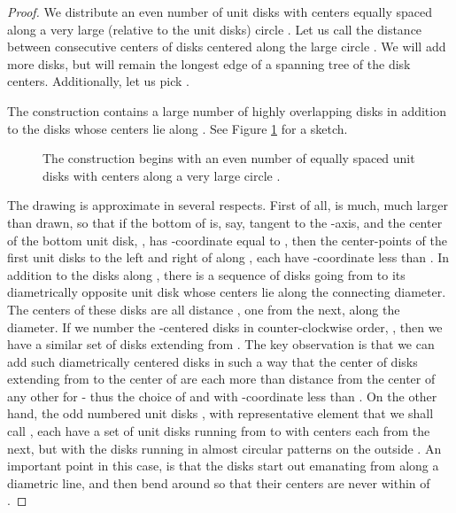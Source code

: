 \begin{proof}
We distribute an even number of unit disks with centers equally spaced along a very large (relative to the unit disks) circle .  Let us call the distance between consecutive centers of disks centered along the large circle  .  We will add more disks, but  will remain the longest edge of a spanning tree of the disk centers.  Additionally, let us pick .

The construction contains a large number of highly overlapping disks in addition to the disks whose centers lie along .  See Figure \ref{flower} for a sketch.
\begin{figure}[h]
\centerline{}
\caption{The construction begins with an even number of equally spaced unit disks with centers along a very large circle .}
\label{flower}
\end{figure}
The drawing is approximate in several respects.  First of all,  is much, much larger than drawn, so that if the bottom of  is, say, tangent to the -axis, and the center of the bottom unit disk, , has -coordinate equal to , then the center-points of the first unit disks to the left and right of  along , each have -coordinate less than .  In addition to the disks along , there is a sequence of disks going from  to its diametrically opposite unit disk whose centers lie along the connecting diameter. The centers of these disks are all distance , one from the next, along the diameter.  If we number the -centered disks in counter-clockwise order, , then we have a similar set of disks extending from .  The key observation is that we can add such diametrically centered disks in such a way that the center of disks extending from  to the center of  are each more than distance  from the center of any other  for  - thus the choice of  and  with -coordinate less than .  On the other hand, the odd numbered unit disks , with representative element that we shall call , each have a set of unit disks running from  to  with centers each  from the next, but with the disks running in almost circular patterns on the outside .  An important point in this case, is that the disks start out emanating from  along a diametric line, and then bend around so that their centers are never within  of .


\end{proof}
